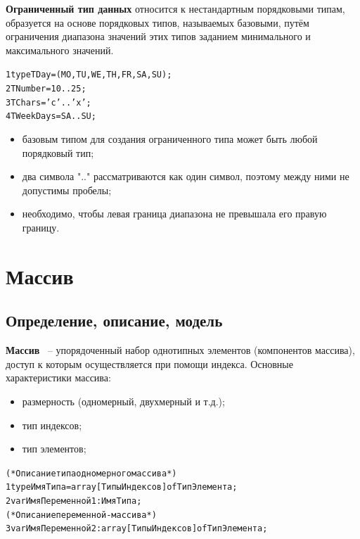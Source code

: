 \documentclass{beamer}
\begin{document}
\begin{frame}[fragile]
\textbf{Ограниченный тип данных} относится к нестандартным порядковыми
типам, образуется на основе порядковых типов, называемых базовыми,
путём ограничения диапазона значений этих типов заданием минимального и максимального значений.
\begin{alltt}
1  type TDay = (MO, TU, WE, TH, FR, SA, SU);
2       TNumber = 10..25;
3       TChars = 'c'..'x';
4       TWeekDays = SA..SU;
\end{alltt}
\begin{itemize}
\item базовым типом для создания ограниченного типа может быть любой
порядковый тип;
\item два символа ".." рассматриваются как один символ, поэтому между
ними не допустимы пробелы;
\item необходимо, чтобы левая граница диапазона не превышала его правую
границу.
\end{itemize}
\end{frame}

\section{Массив}
\subsection{Определение, описание, модель}

\begin{frame}[fragile]
\textbf{Массив} ~-- упорядоченный набор однотипных элементов (компонентов массива), доступ к которым осуществляется при помощи индекса.
Основные характеристики массива:
\begin{itemize}
\item размерность (одномерный, двухмерный и т.д.);
\item тип индексов;
\item тип элементов;
\end{itemize}
\begin{alltt}
(* Описание типа одномерного массива *)
1  type ИмяТипа = array[ТипыИндексов] of ТипЭлемента;
2  var ИмяПеременной1: ИмяТипа;
(* Описание переменной-массива *)
3  var ИмяПеременной2: array[ТипыИндексов] of ТипЭлемента;
\end{alltt}
\end{frame}
\end{document}
